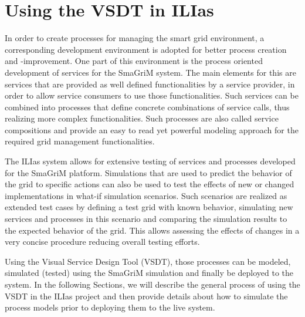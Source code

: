 \chapter{Using the VSDT in ILIas}


In order to create processes for managing the smart grid environment, a
corresponding development environment is adopted for better process creation and
-improvement.  One part of this environment is the process oriented development
of services for the SmaGriM system.  The main elements for this are services that
are provided as well defined functionalities by a service provider, in order to
allow service consumers to use those functionalities.  Such services can be
combined into processes that define concrete combinations of service calls, thus
realizing more complex functionalities.  Such processes are also called service
compositions and provide an easy to read yet powerful modeling approach for the
required grid management functionalities.

The ILIas system allows for extensive testing of services and processes developed
for the SmaGriM platform.  Simulations that are used to predict the behavior of
the grid to specific actions can also be used to test the effects of new or changed
implementations in what-if simulation scenarios.  Such scenarios are realized as
extended test cases by defining a test grid with known behavior, simulating new
services and processes in this scenario and comparing the simulation results to
the expected behavior of the grid.  This allows assessing the effects of changes
in a very concise procedure reducing overall testing efforts.

Using the Visual Service Design Tool (VSDT), those processes can be modeled,
simulated (tested) using the SmaGriM simulation and finally be deployed to the
system.  In the following Sections, we will describe the general process of using
the VSDT in the ILIas project and then provide details about how to simulate the
process models prior to deploying them to the live system.


